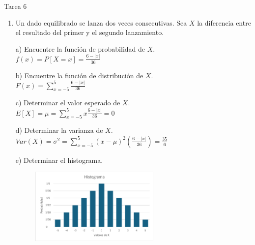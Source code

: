 \documentclass[a4paper, 12pt]{article}
\newcommand{\Aspace}{0.2cm}
\begin{document}
    \newpage
    \begin{center}
        { \LARGE Tarea 6}
    \end{center}

    \begin{enumerate}
        \item Un dado equilibrado se lanza dos veces consecutivas. Sea $X$ la diferencia entre el resultado del primer y el segundo lanzamiento.
            \vspace{\Aspace} \par
            a) Encuentre la función de probabilidad de $X$.
            \\ { \color{azul} $f(x) = P[X = x] = \frac{6 - |x|}{36}$ }

            \vspace{\Aspace} \par
            b) Encuentre la función de distribución de $X$.
            \\ { \color{azul} $F(x) = \sum\limits_{x = -5}^{5} \frac{6 - |x|}{36}$ }

            \vspace{\Aspace} \par
            c) Determinar el valor esperado de $X$.
            \\ { \color{azul} $E[X] = \mu = \sum\limits_{x = -5}^{5} x\frac{6 - |x|}{36} = 0$ }

            \vspace{\Aspace} \par
            d) Determinar la varianza de $X$.
            \\ { \color{azul} $Var(X) = \sigma^{2} = \sum\limits_{x = -5}^{5} (x - \mu)^{2} (\frac{6 - |x|}{36}) = \frac{35}{6}$ }

            \vspace{\Aspace} \par
            e) Determinar el histograma.
            \begin{figure}[h]
                \centering
                \includegraphics[width=0.6\textwidth]{./Assets/HistogramaT6P1.png}
            \end{figure}


\end{enumerate}
\end{document}
